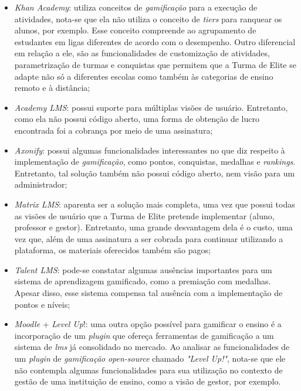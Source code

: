 \begin{itemize}

\item {\textit{Khan Academy}:} utiliza conceitos de \textit{gamificação} para a execução de atividades, nota-se que ela não utiliza o conceito de \textit{\glspl{tier}} para ranquear os alunos, por exemplo. Esse conceito compreende ao agrupamento de estudantes em ligas diferentes de acordo com o desempenho. Outro diferencial em relação a ele, são as funcionalidades de customização de atividades, parametrização de turmas e conquistas que permitem que a Turma de Elite se adapte não só a diferentes escolas como também às categorias de ensino remoto e à distância;

\item {\textit{Academy LMS}:} possui suporte para múltiplas visões de usuário.
Entretanto, como ela não possui código aberto, uma forma de obtenção de lucro encontrada foi a cobrança por meio de uma assinatura;

\item{\textit{Axonify}:} possui algumas funcionalidades interessantes no que diz respeito à implementação de \textit{gamificação}, como pontos, conquistas, medalhas e \textit{\glspl{ranking}}. Entretanto, tal solução também não possui código aberto, nem visão para um administrador;

\item{\textit{Matrix LMS}:} aparenta ser a solução mais completa, uma vez que possui todas as visões de usuário que a Turma de Elite pretende implementar (aluno, professor e gestor). Entretanto, uma grande desvantagem dela é o custo, uma vez que, além de uma assinatura a ser cobrada para continuar utilizando a plataforma, os materiais oferecidos também são pagos;

\item{\textit{Talent LMS}:} pode-se constatar algumas ausências importantes para um sistema de aprendizagem gamificado, como a premiação com medalhas. Apesar disso, esse sistema compensa tal ausência com a implementação de pontos e níveis;


\item{\textit{Moodle} + \textit{Level Up}!:} uma outra opção possível para gamificar o ensino é a incorporação de um \textit{\gls{plugin}} que ofereça ferramentas de gamificação a um sistema de \textit{\ac{lms}} já consolidado no mercado. Ao analisar as funcionalidades de um \textit{\gls{plugin}} de \textit{gamificação} \textit{\gls{open-source}} chamado \textit{"Level Up!"}, nota-se que ele não contempla algumas funcionalidades para sua utilização no contexto de gestão de uma instituição de ensino, como a visão de gestor, por exemplo.

\end{itemize}

